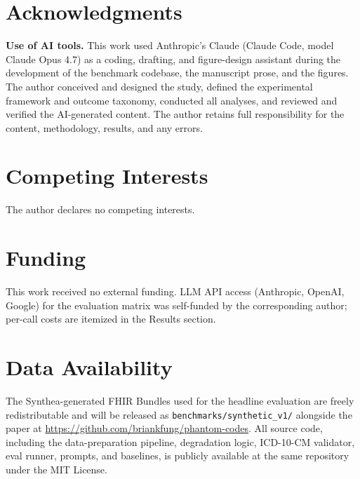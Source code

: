 \documentclass[journal]{IEEEtran}
\begin{document}








\section*{Acknowledgments}
\textbf{Use of AI tools.} This work used Anthropic's Claude (Claude
Code, model Claude Opus 4.7) as a coding, drafting, and
figure-design assistant during the development of the benchmark
codebase, the manuscript prose, and the figures. The author
conceived and designed the study, defined the experimental framework
and outcome taxonomy, conducted all analyses, and reviewed and
verified the AI-generated content. The author retains full
responsibility for the content, methodology, results, and any
errors.

\section*{Competing Interests}
The author declares no competing interests.

\section*{Funding}
This work received no external funding. LLM API access (Anthropic,
OpenAI, Google) for the evaluation matrix was self-funded by the
corresponding author; per-call costs are itemized in the Results
section.

\section*{Data Availability}
The Synthea-generated FHIR Bundles used for the headline evaluation
are freely redistributable and will be released as
\texttt{benchmarks/synthetic\_v1/} alongside the paper at
\url{https://github.com/briankfung/phantom-codes}. All source code,
including the data-preparation pipeline, degradation logic,
ICD-10-CM validator, eval runner, prompts, and baselines, is
publicly available at the same repository under the MIT License.
\end{document}

